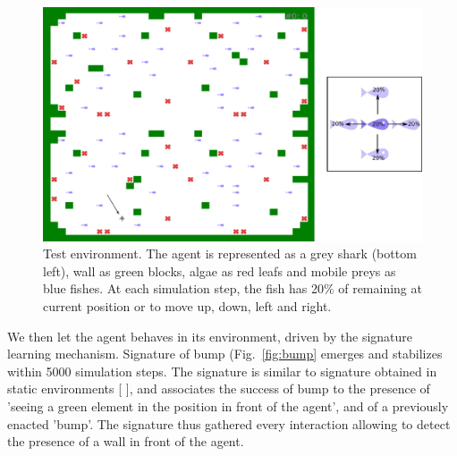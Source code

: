 \documentclass[conference]{IEEEtran}
\begin{document}
\begin{figure}[htbp]
\centerline{\includegraphics[scale=0.28]{img/environment.pdf}}
\caption{Test environment. The agent is represented as a grey shark (bottom left), wall as green blocks, algae as red leafs and mobile preys as blue fishes. At each simulation step, the fish has 20\% of remaining at current position or to move up, down, left and right. 
}
\label{fig:environment}
\end{figure}




We then let the agent behaves in its environment, driven by the signature learning mechanism. Signature of bump (Fig.~\ref{fig:bump} emerges and stabilizes within 5000 simulation steps. The signature is similar to signature obtained in static environments [ ], and associates the success of bump to the presence of 'seeing a green element in the position in front of the agent', and of a previously enacted 'bump'. The signature thus gathered every interaction allowing to detect the presence of a wall in front of the agent. %
\end{document}
